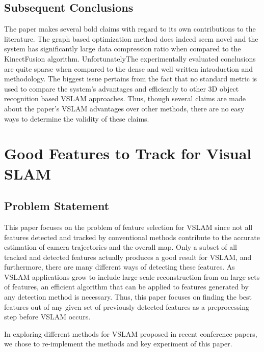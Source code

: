 \documentclass[10pt,twocolumn,letterpaper]{article}
\begin{document}
\subsection{Subsequent Conclusions}
The paper makes several bold claims with regard to its own contributions to the literature. The graph based optimization method does indeed seem novel and the system has significantly large data compression ratio when compared to the KinectFusion algorithm. UnfortunatelyThe experimentally evaluated conclusions are quite sparse when compared to the dense and well written introduction and methodology. The biggest issue pertains from the fact that no standard metric is used to compare the system's advantages and efficiently to other 3D object recognition based VSLAM approaches. Thus, though several claims are made about the paper's VSLAM advantages over other methods, there are no easy ways to determine the validity of these claims.


\section {Good Features to Track for Visual SLAM}

\subsection{Problem Statement}

This paper focuses on the problem of feature selection for VSLAM since not all features 
detected and tracked by conventional methods contribute to the accurate estimation of 
camera trajectories and the overall map.  Only a subset of all tracked and detected features 
actually produces a good result for VSLAM, and furthermore, there are many different ways of
detecting these features. As VSLAM applications grow to include large-scale reconstruction from 
on large sets of features, an efficient algorithm that can be applied to features generated by any 
detection method is necessary. Thus, this paper focuses on finding the best features out of any given 
set of previously detected features as a preprocessing step before VSLAM occurs.

In exploring different methods for VSLAM proposed in recent conference papers, 
we chose to re-implement the methods and key experiment of this paper.
\end{document}
